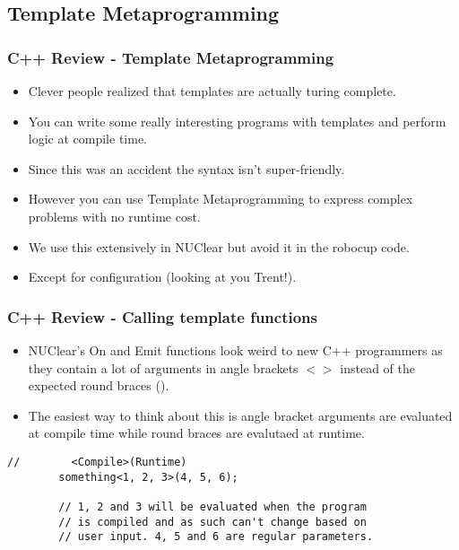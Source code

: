 \documentclass{beamer}
\begin{document}
\subsection{Template Metaprogramming}
\begin{frame}
	\frametitle{C++ Review - Template Metaprogramming}
	\begin{itemize}
		\item Clever people realized that templates are actually turing complete.
		\item You can write some really interesting programs with templates and perform logic at compile time.
		\item Since this was an accident the syntax isn't super-friendly.
		\item However you can use Template Metaprogramming to express complex problems with no runtime cost.
		\item We use this extensively in NUClear but avoid it in the robocup code.
		\item Except for configuration (looking at you Trent!).
	\end{itemize}
\end{frame}

\begin{frame}[fragile]
	\frametitle{C++ Review - Calling template functions}
	\begin{itemize}
		\item NUClear's On and Emit functions look weird to new C++ programmers as they contain a lot of arguments in angle brackets 
			$<>$ instead of the expected round braces ().
		\item The easiest way to think about this is angle bracket arguments are evaluated at compile time while round braces are
			evalutaed at runtime. 
	\end{itemize}

	\begin{lstlisting}[language=nuclear]
		//	      <Compile>(Runtime)
		something<1, 2, 3>(4, 5, 6);

		// 1, 2 and 3 will be evaluated when the program 
		// is compiled and as such can't change based on
		// user input. 4, 5 and 6 are regular parameters.
	\end{lstlisting}
\end{frame}
\end{document}

